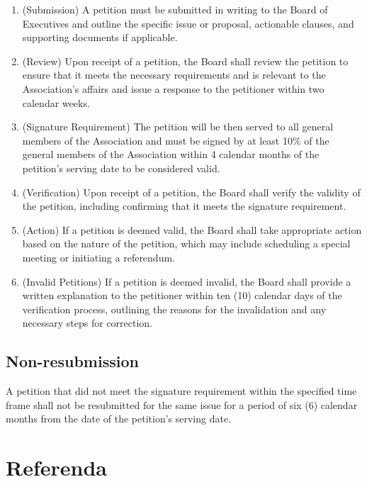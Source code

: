 \begin{enumerate}
    \item (Submission) A petition must be submitted in writing to the 
    Board of Executives and outline the specific issue or proposal, 
    actionable clauses, and supporting documents if applicable.

    \item (Review) Upon receipt of a petition, the Board shall review the
    petition to ensure that it meets the necessary requirements and is
    relevant to the Association's affairs and issue a response to the petitioner
    within two calendar weeks.

    \item (Signature Requirement) The petition will be then served to
     all general members of the Association and must be signed by at least
     10\% of the general members of the Association within 4 calendar
     months of the petition's serving date to be considered valid.

    \item (Verification) Upon receipt of a petition, the Board shall
    verify the validity of the petition, including confirming that it
    meets the signature requirement.

    \item (Action) If a petition is deemed valid, the Board shall take
    appropriate action based on the nature of the petition, which may
    include scheduling a special meeting or initiating a referendum.

    \item (Invalid Petitions) If a petition is deemed invalid, the Board shall
    provide a written explanation to the petitioner within ten (10) calendar
    days of the verification process, outlining the reasons for the 
    invalidation and any necessary steps for correction.
\end{enumerate}

\subsection{Non-resubmission}
A petition that did not meet the signature requirement within the specified
time frame shall not be resubmitted for the same issue for a period of 
six (6) calendar months from the date of the petition's serving date.

\section{Referenda}

